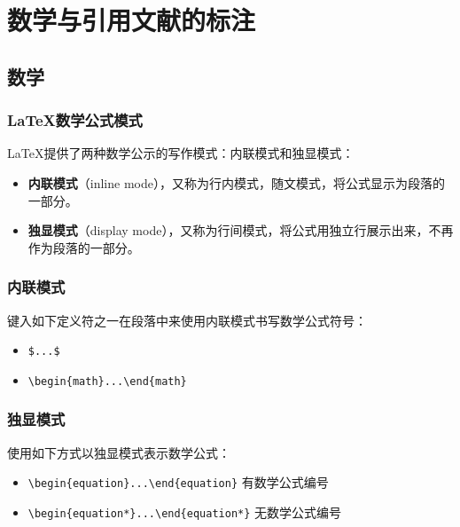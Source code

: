 
\chapter{数学与引用文献的标注}

\section{数学}

\subsection{\LaTeX 数学公式模式}

\LaTeX 提供了两种数学公示的写作模式：内联模式和独显模式：

\begin{itemize}
    \item \textbf{内联模式}（inline mode），又称为行内模式，随文模式，将公式显示为段落的一部分。
    \item \textbf{独显模式}（display mode），又称为行间模式，将公式用独立行展示出来，不再作为段落的一部分。
\end{itemize}

\subsection{内联模式}

键入如下定义符之一在段落中来使用内联模式书写数学公式符号：

\begin{itemize}
    \item \verb|$...$|
    \item \verb|\begin{math}...\end{math}|
\end{itemize}

\subsection{独显模式}

使用如下方式以独显模式表示数学公式：

\begin{itemize}
    \item \verb|\begin{equation}...\end{equation}| 有数学公式编号
    \item \verb|\begin{equation*}...\end{equation*}| 无数学公式编号
\end{itemize}


